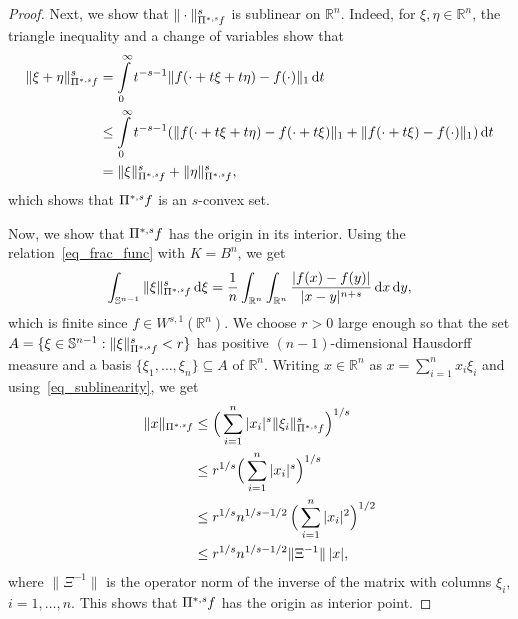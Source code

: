 \documentclass[10pt,a4paper]{amsart}
\newcommand{\Bvtex}{{B^n}}
\newcommand{\dvtex}{\,\mathrm{d}}
\newcommand{\ofpp}[1]{\operatorname{\Pi^{\ast,{\it #1}}}\!}
\newcommand{\snvtex}{{\mathbb S}^{n-1}}
\begin{document}
\begin{proof}
Next, we show that $\Vert \cdot \Vert _{\ofpp{s}f}^{s}$ is sublinear on
$\mathbb R^{n}$. Indeed, for $\xi , \eta \in \mathbb R^{n}$, the triangle
inequality and a change of variables show that
%
\begin{equation}
%
\begin{split} \Vert \xi +\eta \Vert _{\ofpp{s} f}^{s}
&= \int \limits _{0}^{\infty }t^{-s-1} \|f(\cdot +t\xi +t\eta )-f(
\cdot )\|_{1} \dvtex t
\\
&\leq \int \limits _{0}^{\infty }t^{-s-1} ( \|f(\cdot +t\xi +t\eta )-f(
\cdot +t\xi )\|_{1} + \|f(\cdot +t\xi )-f(\cdot )\|_{1} ) \dvtex t
\label{eq_sublinearity}
\\
&= \|\xi \|_{\ofpp{s} f}^{s}+ \|\eta \|_{\ofpp{s} f}^{s},
\end{split}
%
\end{equation}
%
which shows that $\ofpp{s} f$ is an $s$-convex set.

Now, we show that $\ofpp{s} f$ has the origin in its interior. Using the
relation~\eqref{eq_frac_func} with $K=\Bvtex $, we get
%
\begin{equation}
\int _{\snvtex} \Vert \xi \Vert _{\ofpp{s}f}^{s} \dvtex \xi = \frac {1}{n}
\int _{\mathbb R^{n}}\int _{\mathbb R^{n}}
\frac{|f(x)-f(y)|}{|x-y|^{n+s}} \dvtex x \dvtex y,
\nonumber \end{equation}
%
which is finite since $f\in W^{s,1}(\mathbb R^{n})$. We choose $r>0$ large
enough so that the set
$A = \{\xi \in \snvtex : \Vert \xi \Vert _{\ofpp{s}f}^{s} < r\}$ has positive
$(n-1)$-dimensional Hausdorff measure and a basis
$\{\xi _{1}, \ldots , \xi _{n}\} \subseteq A$ of $\mathbb R^{n}$. Writing
$x \in \mathbb R^{n}$ as $x = \sum _{i=1}^{n} x_{i} \xi _{i}$ and using~\eqref{eq_sublinearity}, we get
%
\begin{equation}
\label{eq_bounded}
%
\begin{split} \|x\|_{\ofpp sf} &\leq \Big( \sum _{i=1}^{n} |x_{i}|^{s}
\|\xi _{i}\|_{\ofpp sf}^{s} \Big)^{1/s}
\\
&\leq r^{1/s} \Big( \sum _{i=1}^{n} |x_{i}|^{s} \Big)^{1/s}
\\
&\leq r^{1/s} n^{1/s-1/2}\, \Big( \sum _{i=1}^{n} |x_{i}|^{2} \Big)^{1/2}
\\
&\leq r^{1/s} n^{1/s-1/2} \|\Xi ^{-1}\| \, |x|,
\end{split}
%
\end{equation}
%
where $\|\Xi ^{-1}\|$ is the operator norm of the inverse of the matrix
with columns $\xi _{i}$, $i=1, \ldots , n$. This shows that
$\ofpp sf$ has the origin as interior point.


\end{proof}
\end{document}
